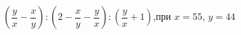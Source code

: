 \begin{ex}[type=calculate_expression]
	\begin{condition}
		\( \left( \dfrac{y}{x}-\dfrac{x}{y} \right):\left( 2-\dfrac{x}{y}-\dfrac{y}{x} \right):\left( \dfrac{y}{x}+1 \right) \),\quad при \( x=55 \), \( y=44 \)
	\end{condition}
\end{ex}
